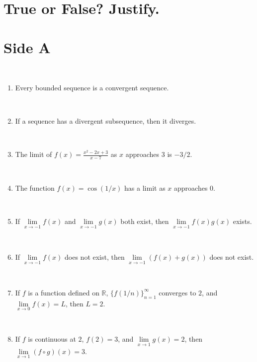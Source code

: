 \documentclass[12pt]{amsart}
\newcommand{\R}{{\mathbb{R}}}
\numberwithin{equation}{section}
\theoremstyle{plain} %
\theoremstyle{definition}
\theoremstyle{remark}
\begin{document}
\thispagestyle{empty}

\section*{\large True or False? Justify.}

\medskip

\section*{Side A}


\



\begin{enumerate}

\item  Every bounded sequence is a convergent sequence.
	
	\
	
\item  If a sequence has a divergent subsequence, then it diverges.
	
	\

\item  The limit of $\displaystyle f(x)=\frac{x^2 - 2x + 3}{x-7}$ as $x$ approaches $3$ is $-3/2$.
	
	\

	\item  The function $f(x)=\cos(1/x)$ has a limit as $x$ approaches $0$.
	
	\
		
	\item  If $\lim\limits_{x\to -1} f(x)$ and $\lim\limits_{x\to -1} g(x)$ both exist, then $\lim\limits_{x\to -1} f(x)g(x)$ exists.
	
	\
	
			
	\item  If $\lim\limits_{x\to -1} f(x)$ does not exist, then $\lim\limits_{x\to -1} (f(x)+ g(x))$ does not exist.
	
	\
	

	
\item  If $f$ is a function defined on $\R$, $\{ f(1/n) \}_{n=1}^\infty$ converges to $2$, and
 ${\lim\limits_{x\to 0} f(x)=L}$, then $L=2$.

\



\item  If $f$ is continuous at $2$, $f(2)=3$, and ${\lim\limits_{x\to 1} g(x)=2}$, then ${\lim\limits_{x\to 1}  (f\circ g)(x) = 3}$.
 

\end{enumerate}
\end{document}

